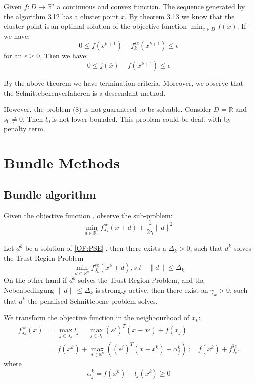 \begin{theorem}
	Given $f: D \longrightarrow \mathbb{R}^n$ a continuous and convex function. The sequence generated by the algorithm 3.12 has a cluster point $\overline{x}$. By theorem 3.13 we know that the cluster point is an optimal solution of the objective function $\min_{x \in D} f(x)$. If we have:
	\begin{equation*}
		0 \leq f(x^{k + 1}) - f^{se}_k(x^{k+1}) \leq \epsilon
	\end{equation*}
	for an $\epsilon \geq 0$,
	Then we have:
	\begin{equation*}
		0 \leq f(\overline{x}) - f(x^{k + 1}) \leq \epsilon
	\end{equation*}
\end{theorem}

By the above theorem we have termination criteria. Moreover, we observe that the Schnittebenenverfaheren is a descendant method. \par 
However, the problem (8) is not guaranteed to be solvable. Consider $D = \mathbb{R}$ and $s_0 \neq 0$. Then $l_0$ is not lower bounded. This problem could be dealt with by penalty term.  


\section{Bundle Methods}
\subsection{Bundle algorithm}
Given the objective function , observe the sub-problem:
\begin{equation} 
	\min_{d \in \mathbb{R}^n } f^{se}_{J_k}(x + d) + \frac{1}{2 \gamma} \| d\|^2
\label{OF:PSE}
\end{equation}

\begin{lemma}
Let $d^k$ be a solution of \ref{OF:PSE} , then there exists a $\Delta_k > 0$, such that $d^k$ solves the Trust-Region-Problem
	\begin{equation*}
		\min_{d \in \mathbb{R}^n} f_{J_k}^{se}(x^k + d), s.t \quad \|d\| \leq \Delta_k
	\end{equation*}	
On the other hand if $d^k$ solves the Trust-Region-Problem, and the Nebenbedingung $ \|d\| \leq \Delta_k$ is strongly active, then there exist an $\gamma_k > 0$, such that $d^k$ the penalised Schnittebene problem solves.
\end{lemma}

We transform the objective function in the neighbourhood of $x_k$:
\begin{align*}
	f^{se}_{J_k}(x) &= \max_{j \in J_k} l_j = \max_{j \in J_k} (s^j)^T(x - x^j) + f(x_j) \\
	&= f(x^k) + \max_{ d \in \mathbb{R}^n}((s^j)^T(x - x^k) - \alpha_j^k) := f(x^k) + \overline{f^{se}_{J_k}}. 
\end{align*} 
where
\begin{equation*}
	\alpha_j^k = f(x^k) - l_j(x^k) \geq 0
\end{equation*}

